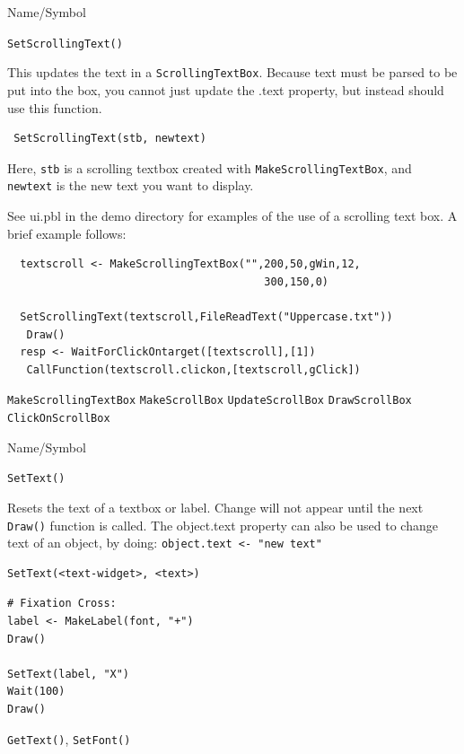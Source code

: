 \begin{desc}{Name/Symbol}
\item[Name/Symbol]  	\verb+SetScrollingText()+

\item[Description]	
This updates the text in a \verb+ScrollingTextBox+. Because text must be parsed to be put into the box, you cannot just update the .text property, but instead should use this function.

\item[Usage]
\begin{verbatim}
 SetScrollingText(stb, newtext)
  \end{verbatim}

Here,  \texttt{stb} is a scrolling textbox created with \verb|MakeScrollingTextBox|, and \texttt{newtext} is the new text you want to display.


\item[Example]      	
See ui.pbl in the demo directory for examples of the use of a scrolling text box.  A brief example follows:

\begin{verbatim}
  textscroll <- MakeScrollingTextBox("",200,50,gWin,12,
                                        300,150,0)

  SetScrollingText(textscroll,FileReadText("Uppercase.txt"))
   Draw()
  resp <- WaitForClickOntarget([textscroll],[1])
   CallFunction(textscroll.clickon,[textscroll,gClick]) 
\end{verbatim}

\item[See Also]
\verb+MakeScrollingTextBox+
\verb+MakeScrollBox+
\verb+UpdateScrollBox+
\verb+DrawScrollBox+
\verb+ClickOnScrollBox+
\end{desc}




\begin{desc}{Name/Symbol}

\item[Name/Symbol] 	\verb+SetText()+

\item[Description] 	Resets the text of a textbox or label.  Change will not
		appear until the next \verb+Draw()+ function is called.  The
object.text property can also be used to change text of an object, by
doing: \verb+object.text <- "new text"+

\item[Usage]
\begin{verbatim}
SetText(<text-widget>, <text>)
\end{verbatim}

\item[Example]
\begin{verbatim}
# Fixation Cross:
label <- MakeLabel(font, "+")
Draw()

SetText(label, "X")
Wait(100)
Draw()
\end{verbatim}

\item[See Also]    	\verb+GetText()+, \verb+SetFont()+
\end{desc}

